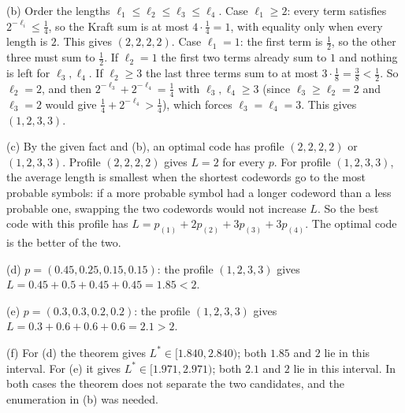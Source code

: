 \begin{enumerate}[resume*=quiz]
\begin{solution}
(b) Order the lengths $\ell_1\le\ell_2\le\ell_3\le\ell_4$.
Case $\ell_1\ge2$: every term satisfies $2^{-\ell_i}\le\tfrac14$, so the Kraft sum is at most $4\cdot\tfrac14=1$, with equality only when every length is $2$. This gives $(2,2,2,2)$.
Case $\ell_1=1$: the first term is $\tfrac12$, so the other three must sum to $\tfrac12$. If $\ell_2=1$ the first two terms already sum to $1$ and nothing is left for $\ell_3,\ell_4$. If $\ell_2\ge3$ the last three terms sum to at most $3\cdot\tfrac18=\tfrac38<\tfrac12$. So $\ell_2=2$, and then $2^{-\ell_3}+2^{-\ell_4}=\tfrac14$ with $\ell_3,\ell_4\ge3$ (since $\ell_3\ge\ell_2=2$ and $\ell_3=2$ would give $\tfrac14+2^{-\ell_4}>\tfrac14$), which forces $\ell_3=\ell_4=3$. This gives $(1,2,3,3)$.

(c) By the given fact and (b), an optimal code has profile $(2,2,2,2)$ or $(1,2,3,3)$. Profile $(2,2,2,2)$ gives $L=2$ for every $p$. For profile $(1,2,3,3)$, the average length is smallest when the shortest codewords go to the most probable symbols: if a more probable symbol had a longer codeword than a less probable one, swapping the two codewords would not increase $L$. So the best code with this profile has $L=p_{(1)}+2p_{(2)}+3p_{(3)}+3p_{(4)}$. The optimal code is the better of the two.

(d) $p=(0.45,0.25,0.15,0.15)$: the profile $(1,2,3,3)$ gives $L=0.45+0.5+0.45+0.45=1.85<2$.

(e) $p=(0.3,0.3,0.2,0.2)$: the profile $(1,2,3,3)$ gives $L=0.3+0.6+0.6+0.6=2.1>2$.

(f) For (d) the theorem gives $L^*\in[1.840,2.840)$; both $1.85$ and $2$ lie in this interval. For (e) it gives $L^*\in[1.971,2.971)$; both $2.1$ and $2$ lie in this interval. In both cases the theorem does not separate the two candidates, and the enumeration in (b) was needed.
\end{solution}


\end{enumerate}
